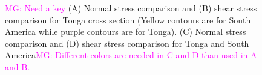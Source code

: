 \documentclass[12pt]{article}
\newcommand{\mgnote}[1]{\textcolor{magenta}{MG: #1}}
\begin{document}
{\begin{figure}[H]
\centering
\hspace{-0.2cm}
\hspace{-0.2cm}
\hspace{-0.2cm}
\hspace{-0.2cm}
\caption{
\mgnote{Need a key}
(A) Normal stress comparison and 
(B) shear stress comparison for Tonga cross section (Yellow contours are for South America while purple contours are for Tonga). 
(C) Normal stress comparison and (D) shear stress comparison for Tonga and South America\mgnote{Different colors are needed in C and D than used in A and B.}}
\label{fig:shear_smaller}
\end{figure}



}
\end{document}
